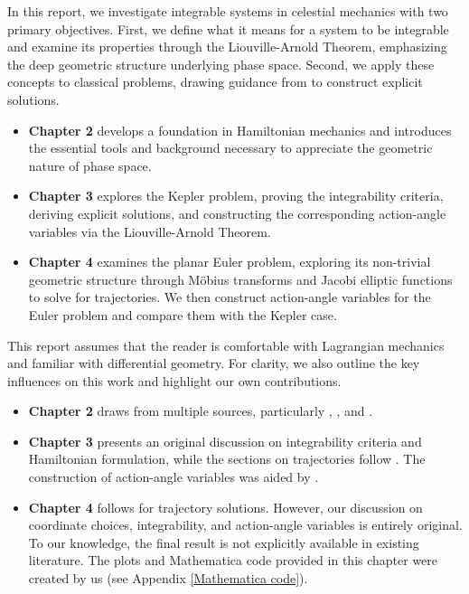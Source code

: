 \documentclass[12pt,oneside]{report}
\theoremstyle{definition}
\begin{document}
In this report, we investigate integrable systems in celestial mechanics with two primary objectives. First, we define what it means for a system to be integrable and examine its properties through the Liouville-Arnold Theorem, emphasizing the deep geometric structure underlying phase space. Second, we apply these concepts to classical problems, drawing guidance from \cite{o2008integrable} to construct explicit solutions.

\begin{itemize}
    \item \textbf{Chapter 2} develops a foundation in Hamiltonian mechanics and introduces the essential tools and background necessary to appreciate the geometric nature of phase space.
    \item \textbf{Chapter 3} explores the Kepler problem, proving the integrability criteria, deriving explicit solutions, and constructing the corresponding action-angle variables via the Liouville-Arnold Theorem.
    \item \textbf{Chapter 4} examines the planar Euler problem, exploring its non-trivial geometric structure through Möbius transforms and Jacobi elliptic functions to solve for trajectories. We then construct action-angle variables for the Euler problem and compare them with the Kepler case.
\end{itemize}

This report assumes that the reader is comfortable with Lagrangian mechanics and familiar with differential geometry. For clarity, we also outline the key influences on this work and highlight our own contributions.
\begin{itemize}
    \item \textbf{Chapter 2} draws from multiple sources, particularly \cite{arnol2013mathematical}, \cite{goldstein2002classical}, \cite{TMPB23/24} and \cite{DavidTong}.
    \item \textbf{Chapter 3} presents an original discussion on integrability criteria and Hamiltonian formulation, while the sections on trajectories follow \cite{o2008integrable}. The construction of action-angle variables was aided by \cite{goldstein2002classical}.
    \item \textbf{Chapter 4} follows \cite{o2008integrable} for trajectory solutions. However, our discussion on coordinate choices, integrability, and action-angle variables is entirely original. To our knowledge, the final result is not explicitly available in existing literature. The plots and Mathematica code provided in this chapter were created by us (see Appendix \ref{Mathematica code}).
\end{itemize}
\end{document}
